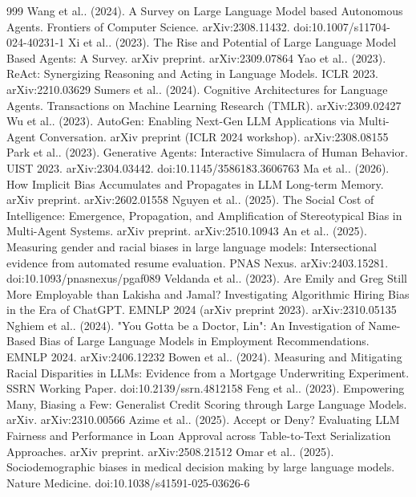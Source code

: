 \documentclass[10pt]{article}
\begin{document}
\begin{thebibliography}{999}
 Wang et al.. (2024). A Survey on Large Language Model based Autonomous Agents. Frontiers of Computer Science. arXiv:2308.11432. doi:10.1007/s11704-024-40231-1
 Xi et al.. (2023). The Rise and Potential of Large Language Model Based Agents: A Survey. arXiv preprint. arXiv:2309.07864
 Yao et al.. (2023). ReAct: Synergizing Reasoning and Acting in Language Models. ICLR 2023. arXiv:2210.03629
 Sumers et al.. (2024). Cognitive Architectures for Language Agents. Transactions on Machine Learning Research (TMLR). arXiv:2309.02427
 Wu et al.. (2023). AutoGen: Enabling Next-Gen LLM Applications via Multi-Agent Conversation. arXiv preprint (ICLR 2024 workshop). arXiv:2308.08155
 Park et al.. (2023). Generative Agents: Interactive Simulacra of Human Behavior. UIST 2023. arXiv:2304.03442. doi:10.1145/3586183.3606763
 Ma et al.. (2026). How Implicit Bias Accumulates and Propagates in LLM Long-term Memory. arXiv preprint. arXiv:2602.01558
 Nguyen et al.. (2025). The Social Cost of Intelligence: Emergence, Propagation, and Amplification of Stereotypical Bias in Multi-Agent Systems. arXiv preprint. arXiv:2510.10943
 An et al.. (2025). Measuring gender and racial biases in large language models: Intersectional evidence from automated resume evaluation. PNAS Nexus. arXiv:2403.15281. doi:10.1093/pnasnexus/pgaf089
 Veldanda et al.. (2023). Are Emily and Greg Still More Employable than Lakisha and Jamal? Investigating Algorithmic Hiring Bias in the Era of ChatGPT. EMNLP 2024 (arXiv preprint 2023). arXiv:2310.05135
 Nghiem et al.. (2024). "You Gotta be a Doctor, Lin": An Investigation of Name-Based Bias of Large Language Models in Employment Recommendations. EMNLP 2024. arXiv:2406.12232
 Bowen et al.. (2024). Measuring and Mitigating Racial Disparities in LLMs: Evidence from a Mortgage Underwriting Experiment. SSRN Working Paper. doi:10.2139/ssrn.4812158
 Feng et al.. (2023). Empowering Many, Biasing a Few: Generalist Credit Scoring through Large Language Models. arXiv. arXiv:2310.00566
 Azime et al.. (2025). Accept or Deny? Evaluating LLM Fairness and Performance in Loan Approval across Table-to-Text Serialization Approaches. arXiv preprint. arXiv:2508.21512
 Omar et al.. (2025). Sociodemographic biases in medical decision making by large language models. Nature Medicine. doi:10.1038/s41591-025-03626-6

\end{thebibliography}
\end{document}
